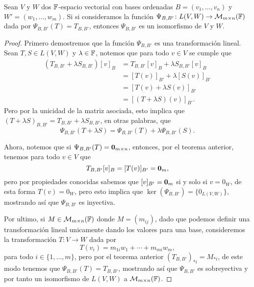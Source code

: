 \begin{teor}
  Sean $V$ y $W$ dos $\mathbb{F}$-espacio vectorial con bases ordenadas $B = (v_1,\ldots,v_n)$ y $W' = (w_1,\ldots,w_m)$. Si si consideramos la función $\Psi_{B,B'}\colon L(V,W) \to \mathcal{M}_{m\times n}(\mathbb{F})$ dada por $\Psi_{B,B'}(T) = T_{B,B'}$, entonces $\Psi_{B,B'}$ es un isomorfismo de $V$ y $W$.
\end{teor}
\begin{proof}
  Primero demostremos que la función $\Psi_{B,B'}$ es una transformación lineal. Sean $T, S \in L(V,W)$ y $\lambda \in \mathbb{F}$, notemos que para todo $v \in V$ se cumple que
  \begin{align*}
    (T_{B,B'} + \lambda S_{B,B'})[v]_B &= T_{B,B'}[v]_B + \lambda S_{B,B'} [v]_B \\
      &= [T(v)]_{B'} + \lambda [S(v)]_{B'} \\
      &= [T(v) + \lambda S(v)]_{B'} \\
      &= [ (T + \lambda S)(v)]_{B'}.
  \end{align*}
  Pero por la unicidad de la matriz asociada, esto implica que $(T + \lambda S)_{B,B'} = T_{B,B'} + \lambda S_{B,B'}$, en otras palabras, que
  \[ \Psi_{B,B'}(T + \lambda S) = \Psi_{B,B'}(T) + \lambda \Psi_{B,B'}(S). \]

  Ahora, notemos que si $\Psi_{B,B'}(T) = \mathbf{0}_{m\times n}$, entonces, por el teorema anterior, tenemos para todo $v \in V$ que  
    \[ T_{B,B'}[v]_B  = [T(v)]_{B'} = \mathbf{0}_m,\]
  pero por propiedades conocidas sabemos que $[v]_{B'} = \mathbf{0}_m$ si y solo si $v = 0_W$, de esta forma $T(v) = 0_W$, pero esto implica que $\ker(\Psi_{B,B'}) = \{  0_{L(V,W)} \}$, mostrando así que $\Psi_{B,B'}$ es inyectiva.

  Por ultimo, si $M \in \mathcal{M}_{m\times n}(\mathbb{F})$ donde $M = (m_{ij})$, dado que podemos definir una transformación lineal unicamente dando los valores para una base, consideremos la transformación $T\colon V \to W$ dada por
  \[ T(v_i) =  m_{1i}w_1 + \cdots + m_{mi}w_m, \]
  para todo $i \in \{1,\ldots,m\}$, pero por el teorema anterior $(T_{B,B'})_{*i} = M_{*i}$, de este modo tenemos que $\Psi_{B,B'}(T) = T_{B,B'}$, mostrando así que $\Psi_{B,B'}$ es sobreyectiva y por tanto un isomorfismo de $L(V,W)$ a $\mathcal{M}_{m\times n}(\mathbb{F})$.
\end{proof}